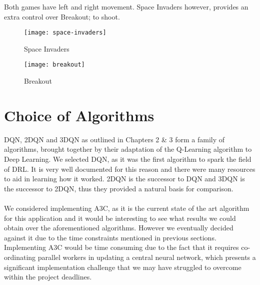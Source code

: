 Both games have left and right movement. Space Invaders however, provides an extra control over Breakout; to shoot.

\begin{figure}[h]
    \begin{minipage}[c]{0.4\textwidth}
        \texttt{[image: space-invaders]}
        \caption{Space Invaders}
        \label{fig:space_invaders}
    \end{minipage}
    \hfill
    \begin{minipage}[c]{0.4\textwidth}
        \texttt{[image: breakout]}
        \caption{Breakout}
        \label{fig:breakout}
    \end{minipage}
\end{figure}

\section{Choice of Algorithms} \label{sec:algos}
DQN, 2DQN and 3DQN as outlined in Chapters 2 \& 3 form a family of algorithms, brought together by their adaptation of the Q-Learning algorithm to Deep Learning. We selected DQN, as it was the first algorithm to spark the field of DRL. It is very well documented for this reason and there were many resources to aid in learning how it worked. 2DQN is the successor to DQN and 3DQN is the successor to 2DQN, thus they provided a natural basis for comparison. \paragraph{}

We considered implementing A3C, as it is the current state of the art algorithm for this application and it would be interesting to see what results we could obtain over the aforementioned algorithms. However we eventually decided against it due to the time constraints mentioned in previous sections. Implementing A3C would be time consuming due to the fact that it requires co-ordinating parallel workers in updating a central neural network, which presents a significant implementation challenge that we may have struggled to overcome within the project deadlines.
